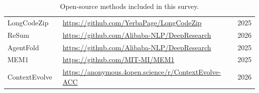 \begin{table}[htbp]
\begin{tabular}{p{}p{}p{}}
LongCodeZip~\citep{shi2025longcodezip} & \url{https://github.com/YerbaPage/LongCodeZip} & 2025 \\
ReSum~\citep{wu2026resumunlockinglonghorizonsearch} & \url{https://github.com/Alibaba-NLP/DeepResearch} & 2026 \\
AgentFold~\citep{ye2025agentfoldlonghorizonwebagents} & \url{https://github.com/Alibaba-NLP/DeepResearch} & 2025 \\
MEM1~\citep{zhou2025mem1learningsynergizememory} & \url{https://github.com/MIT-MI/MEM1} & 2025 \\
ContextEvolve~\citep{su2026contextevolvemultiagentcontextcompression} & \url{https://anonymous.4open.science/r/ContextEvolve-ACC} & 2026 \\
\bottomrule[1.5pt]
\end{tabular}
\caption{Open-source methods included in this survey.}
\label{tab:opensource_methods}
\end{table}
